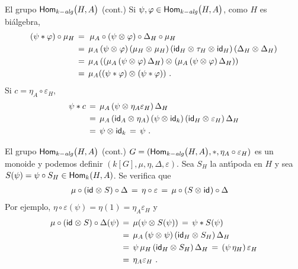 \begin{frame}{El grupo $\Homalg\big(H,A\big)$ (cont.)}
	Si $\psi,\varphi\in\Homalg\big(H,A\big)$, como $H$ es bi\'{a}lgebra,
	\begin{align*}
		(\psi\convol\varphi)\circ\mu_H & \,=\
			\mu_A\circ (\psi\tensor\varphi)\circ\Delta_H\circ\mu_H
				\\
		& \,=\,	\mu_A\,(\psi\tensor\varphi)\,(\mu_H\tensor\mu_H)\,
			(\id[H]\tensor\swap[H]\tensor\id[H])\,
			(\Delta_H\tensor\Delta_H) \\
		& \,=\,\mu_A\,((\mu_A\,(\psi\tensor\varphi)\,\Delta_H)\tensor
			(\mu_A\,(\psi\tensor\varphi)\,\Delta_H)) \\
		& \,=\,\mu_A((\psi\convol\varphi)\tensor(\psi\convol\varphi))
		\text{ .}
	\end{align*}
	Si $c=\eta_A\circ\varepsilon_H$,
	\begin{align*}
		\psi\convol c & \,=\,\mu_A\,(\psi\tensor\eta_A\varepsilon_H)\,
								\Delta_H \\
		& \,=\,\mu_A\,(\id[A]\tensor\eta_A)\,(\psi\tensor\id[k])\,
			(\id[H]\tensor\varepsilon_H)\,\Delta_H \\
		& \,=\,\psi\tensor\id[k]\,=\,\psi
		\text{ .}
	\end{align*}
\end{frame}

\begin{frame}{El grupo $\Homalg\big(H,A\big)$ (cont.)}
	$G=(\Homalg\big(H,A\big),\convol,\eta_A\circ\varepsilon_H)$ es un
	monoide y podemos definir $(k[G],\mu,\eta,\Delta,\varepsilon)$. Sea
	$S_H$ la ant\'{\i}poda en $H$ y sea
	$S(\psi)=\psi\circ S_H\in\Hom[k](H,A)$. Se verifica que
	\begin{align*}
		\mu\circ(\id\tensor S)\circ\Delta & \,=\,
			\eta\circ\varepsilon\,=\,
			\mu\circ(S\tensor\id)\circ\Delta
	\end{align*}
	Por ejemplo, $\eta\circ\varepsilon(\psi)=\eta(1)=\eta_A\varepsilon_H$ y
	\begin{align*}
		\mu\circ(\id\tensor S)\circ\Delta(\psi) & \,=\,
			\mu(\psi\tensor S(\psi)) \,=\,\psi\convol S(\psi) \\
		& \,=\, \mu_A\,(\psi\tensor\psi)\,(\id[H]\tensor S_H)\,
								\Delta_H \\
		& \,=\,\psi\,\mu_H\,(\id[H]\tensor S_H)\,\Delta_H \,=\,
			(\psi\,\eta_H)\,\varepsilon_H \\
		& \,=\,\eta_A\varepsilon_H
		\text{ .}
	\end{align*}
\end{frame}

